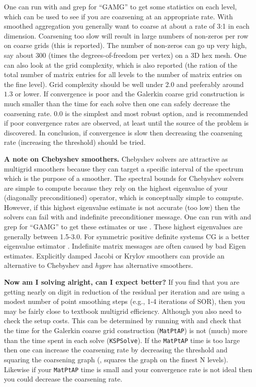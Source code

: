 One can run with  and grep for ``GAMG'' to get some statistics on each
level, which can be used to see if you are coarsening at an
appropriate rate.  With smoothed aggregation you generally want to
coarse at about a rate of 3:1 in each dimension.  Coarsening too slow
will result in large numbers of non-zeros per row on coarse grids
(this is reported).  The number of non-zeros can go up very high, say
about 300 (times the degrees-of-freedom per vertex) on a 3D hex mesh.
One can also look at the grid complexity, which is also reported (the ration of the total number of matrix entries for all levels to the number of matrix entries on the fine level).  
Grid complexity should be well under 2.0 and preferably around $1.3$ or lower.  If
convergence is poor and the Galerkin coarse grid construction is much
smaller than the time for each solve then one can safely decrease the
coarsening rate.   $0.0$ is the simplest and most robust
option, and is recommended if poor
convergence rates are observed, at least until the source of the
problem is discovered.
In conclusion, if convergence is slow then decreasing the coarsening rate (increasing the threshold) should be tried.

{\bf A note on Chebyshev smoothers.} Chebyshev solvers are attractive as multigrid smoothers because they can target a specific interval of the spectrum which is the purpose of a smoother.
The spectral bounds for Chebyshev solvers are simple to compute because they rely on the highest eigenvalue of your (diagonally preconditioned) operator, which is conceptually simple to compute.
However, if this highest eigenvalue estimate is not accurate (too low) then the solvers can fail with and indefinite preconditioner message.
One can run with  and grep for ``GAMG'' to get these estimates or use .
These highest eigenvalues are generally between 1.5-3.0.
For symmetric positive definite systems CG is a better eigenvalue estimator .
Indefinite matrix messages are often caused by bad Eigen estimates.
Explicitly damped Jacobi or Krylov smoothers can provide an alternative to Chebyshev and {\it hypre} has alternative smoothers.

{\bf Now am I solving alright, can I expect better?}
If you find that you are getting nearly on digit in reduction
of the residual per iteration and are using a modest number of point
smoothing steps (e.g., 1-4 iterations of SOR), then you may be fairly
close to textbook multigrid efficiency.  Although you also need to
check the setup costs.  This can be determined by running with
 and check that the time for the Galerkin coarse grid
construction (\lstinline{MatPtAP}) is not (much) more than the time spent in each
solve (\lstinline{KSPSolve}).  If the \lstinline{MatPtAP} time is too large then one can increase the
coarsening rate by decreasing the threshold and squaring the coarsening
graph (, squares the graph on the finest N levels).
Likewise if your \lstinline{MatPtAP} time is small and your convergence rate is not ideal then you could decrease the coarsening rate.

